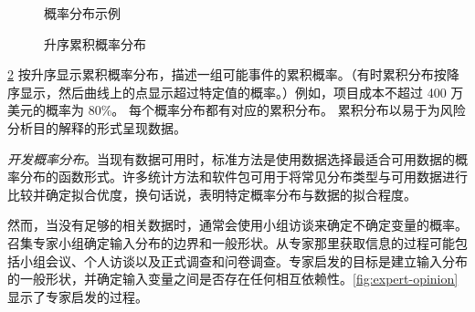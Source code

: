\begin{figure}
  \caption{概率分布示例}
  \label{fig:example-probability-distributions}
\end{figure}

\begin{figure}
  \caption{升序累积概率分布}
  \label{fig:cumulative-probability-distributions}
\end{figure}

\cref{fig:cumulative-probability-distributions} 按升序显示累积概率分布，描述一组可能事件的累积概率。（有时累积分布按降序显示，然后曲线上的点显示超过特定值的概率。）例如，项目成本不超过 400 万美元的概率为 80\%。 每个概率分布都有对应的累积分布。 累积分布以易于为风险分析目的解释的形式呈现数据。

\emph{开发概率分布}。当现有数据可用时，标准方法是使用数据选择最适合可用数据的概率分布的函数形式。许多统计方法和软件包可用于将常见分布类型与可用数据进行比较并确定拟合优度，换句话说，表明特定概率分布与数据的拟合程度。

然而，当没有足够的相关数据时，通常会使用小组访谈来确定不确定变量的概率。召集专家小组确定输入分布的边界和一般形状。从专家那里获取信息的过程可能包括小组会议、个人访谈以及正式调查和问卷调查。专家启发的目标是建立输入分布的一般形状，并确定输入变量之间是否存在任何相互依赖性。\cref{fig:expert-opinion} 显示了专家启发的过程。

